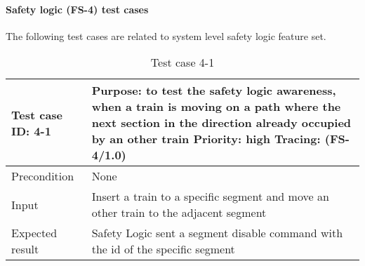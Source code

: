 \paragraph{Safety logic (FS-4) test cases} The following test cases are related to system level safety logic feature set.
\begin{table}[H]
	\caption{Test case 4-1}
	\label{table:TCase-FS4-01}
	\begin{center}
		\renewcommand{\arraystretch}{1.8}
		\begin{tabu} 
			to 0.9 \textwidth
			{  X[0.3, l] X[l] }
			\toprule
			Test case ID: 4-1 & Purpose: to test the safety logic awareness, when a train is moving on a path where the next section in the direction already occupied by an other train \newline Priority: high \newline Tracing: (FS-4/1.0) \\ \midrule
			Precondition      & None                                                                                                                                                                                                          \\
			Input             & Insert a train to a specific segment and move an other train to the adjacent segment                                                                                                                          \\
			Expected result   & Safety Logic sent a segment disable command with the id of the specific segment                                                                                                                               \\ \bottomrule
		\end{tabu}
	\end{center}
\end{table} 

